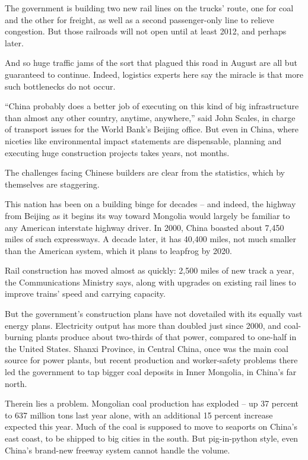 ﻿\documentclass[12pt]{article}
\begin{document}
The government is building two new rail lines on the trucks' route, one for coal and the other for
freight, as well as a second passenger-only line to relieve congestion. But those railroads will not
open until at least 2012, and perhaps later.

And so huge traffic jams of the sort that plagued this road in August are all but guaranteed to
continue. Indeed, logistics experts here say the miracle is that more such bottlenecks do not occur.

``China probably does a better job of executing on this kind of big infrastructure than almost any
other country, anytime, anywhere,'' said John Scales, in charge of transport issues for the World
Bank's Beijing office. But even in China, where niceties like environmental impact statements are
dispensable, planning and executing huge construction projects takes years, not months.

The challenges facing Chinese builders are clear from the statistics, which by themselves are
staggering.

This nation has been on a building binge for decades -- and indeed, the highway from Beijing as it
begins its way toward Mongolia would largely be familiar to any American interstate highway driver.
In 2000, China boasted about 7,450 miles of such expressways. A decade later, it has 40,400 miles,
not much smaller than the American system, which it plans to leapfrog by 2020.

Rail construction has moved almost as quickly: 2,500 miles of new track a year, the Communications
Ministry says, along with upgrades on existing rail lines to improve trains' speed and carrying
capacity.

But the government's construction plans have not dovetailed with its equally vast energy plans.
Electricity output has more than doubled just since 2000, and coal-burning plants produce about
two-thirds of that power, compared to one-half in the United States. Shanxi Province, in Central
China, once was the main coal source for power plants, but recent production and worker-safety
problems there led the government to tap bigger coal deposits in Inner Mongolia, in China's far
north.

Therein lies a problem. Mongolian coal production has exploded -- up 37 percent to 637 million tons
last year alone, with an additional 15 percent increase expected this year. Much of the coal is
supposed to move to seaports on China's east coast, to be shipped to big cities in the south. But
pig-in-python style, even China's brand-new freeway system cannot handle the volume.
\end{document}

